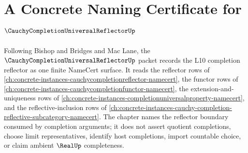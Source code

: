 \chapter{A Concrete Naming Certificate for $\CauchyCompletionUniversalReflectorUp$}
\label{ch:concrete-instances-cauchy-completion-universal-reflector-namecert}

Following Bishop and Bridges and Mac Lane, the $\CauchyCompletionUniversalReflectorUp$ packet records the L10 completion reflector as one finite NameCert surface. It reads the reflector rows of \autoref{ch:concrete-instances-cauchycompletionreflector-namecert}, the functor rows of \autoref{ch:concrete-instances-cauchycompletionfunctor-namecert}, the extension-and-uniqueness rows of \autoref{ch:concrete-instances-completionuniversalproperty-namecert}, and the reflective-inclusion rows of \autoref{ch:concrete-instances-cauchy-completion-reflective-subcategory-namecert}. The chapter names the reflector boundary consumed by completion arguments; it does not assert quotient completions, choose limit representatives, identify host completions, import countable choice, or claim ambient $\RealUp$ completeness.

